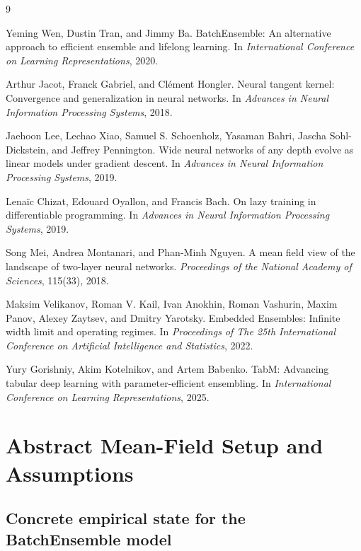 \documentclass[11pt]{article}
\theoremstyle{definition}
\begin{document}
\begin{thebibliography}{9}

Yeming Wen, Dustin Tran, and Jimmy Ba.
\newblock BatchEnsemble: An alternative approach to efficient ensemble and
lifelong learning.
\newblock In \emph{International Conference on Learning Representations}, 2020.

Arthur Jacot, Franck Gabriel, and Cl\'ement Hongler.
\newblock Neural tangent kernel: Convergence and generalization in neural
networks.
\newblock In \emph{Advances in Neural Information Processing Systems}, 2018.

Jaehoon Lee, Lechao Xiao, Samuel S. Schoenholz, Yasaman Bahri, Jascha
Sohl-Dickstein, and Jeffrey Pennington.
\newblock Wide neural networks of any depth evolve as linear models under
gradient descent.
\newblock In \emph{Advances in Neural Information Processing Systems}, 2019.

Lena\"ic Chizat, Edouard Oyallon, and Francis Bach.
\newblock On lazy training in differentiable programming.
\newblock In \emph{Advances in Neural Information Processing Systems}, 2019.

Song Mei, Andrea Montanari, and Phan-Minh Nguyen.
\newblock A mean field view of the landscape of two-layer neural networks.
\newblock \emph{Proceedings of the National Academy of Sciences}, 115(33), 2018.

Maksim Velikanov, Roman V. Kail, Ivan Anokhin, Roman Vashurin, Maxim Panov,
Alexey Zaytsev, and Dmitry Yarotsky.
\newblock Embedded Ensembles: Infinite width limit and operating regimes.
\newblock In \emph{Proceedings of The 25th International Conference on
Artificial Intelligence and Statistics}, 2022.

Yury Gorishniy, Akim Kotelnikov, and Artem Babenko.
\newblock TabM: Advancing tabular deep learning with parameter-efficient
ensembling.
\newblock In \emph{International Conference on Learning Representations}, 2025.

\end{thebibliography}

\appendix

\section{Abstract Mean-Field Setup and Assumptions}
\label{sec:appendix-setup}

\subsection{Concrete empirical state for the BatchEnsemble model}
\end{document}

